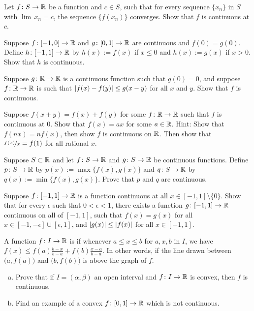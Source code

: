\begin{exercise} \label{exercise:contseqalt}
Let $f \colon S \to {\mathbb{R}}$ be a function and $c \in S$, such that for every
sequence $\{ x_n \}$ in $S$ with $\lim\, x_n = c$, the sequence
$\{ f(x_n) \}$ converges.  Show that $f$ is continuous at $c$.
\end{exercise}

\begin{exercise}
Suppose $f \colon [-1,0] \to {\mathbb{R}}$ and $g \colon [0,1] \to {\mathbb{R}}$ are continuous
and $f(0) = g(0)$.  Define $h \colon [-1,1] \to {\mathbb{R}}$ by 
$h(x) := f(x)$ if $x \leq 0$ and $h(x) := g(x)$ if $x > 0$.  Show that
$h$ is continuous.
\end{exercise}

\begin{exercise}
Suppose $g \colon {\mathbb{R}} \to {\mathbb{R}}$ is a continuous function such that $g(0) = 0$,
and suppose $f \colon {\mathbb{R}} \to {\mathbb{R}}$ is such that
$\left\lvert {f(x)-f(y)} \right\rvert \leq g(x-y)$ for all $x$ and $y$.  Show that $f$ is
continuous.
\end{exercise}

\begin{exercise}[Challenging]
Suppose $f(x+y) = f(x) + f(y)$ for some $f \colon {\mathbb{R}} \to {\mathbb{R}}$
such that $f$ is continuous at 0.
Show that $f(x) = ax$ for some $a \in {\mathbb{R}}$.
Hint: Show that $f(nx) = nf(x)$, then show $f$ is continuous on ${\mathbb{R}}$.
Then show that $\nicefrac{f(x)}{x} = f(1)$ for all rational $x$.
\end{exercise}

\begin{exercise} \label{exercise:minmaxcont}
Suppose $S \subset {\mathbb{R}}$ and
let $f \colon S \to {\mathbb{R}}$ and
$g \colon S \to {\mathbb{R}}$ be continuous functions.
Define $p \colon S \to {\mathbb{R}}$ by
$p(x) := \max \{ f(x) , g(x) \}$ and
$q \colon S \to {\mathbb{R}}$ by
$q(x) := \min \{ f(x) , g(x) \}$.  Prove that $p$ and $q$ are
continuous.
\end{exercise}

\begin{exercise}
Suppose $f \colon [-1,1] \to {\mathbb{R}}$ is a function continuous at all $x \in
[-1,1] \setminus \{ 0 \}$.  Show that for every $\epsilon$ such
that $0 < \epsilon < 1$, there exists
a function $g \colon [-1,1] \to {\mathbb{R}}$ continuous on all of $[-1,1]$, such that
$f(x) = g(x)$ for all $x \in [-1,-\epsilon] \cup [\epsilon,1]$, and 
$\left\lvert {g(x)} \right\rvert \leq \left\lvert {f(x)} \right\rvert$ for all $x \in [-1,1]$.
\end{exercise}

\begin{exercise}[Challenging]
A function $f \colon I \to {\mathbb{R}}$ is \emph{} if
whenever $a \leq x \leq b$ for $a,x,b$ in $I$, we have
$f(x) \leq f(a) \frac{b-x}{b-a} + f(b) \frac{x-a}{b-a}$.  In other words,
if the line drawn between $\bigl(a,f(a)\bigr)$ and $\bigl(b,f(b)\bigr)$ 
is above the graph of $f$.
\begin{enumerate}[a)]
\item
Prove that
if $I = (\alpha,\beta)$ an open interval and $f \colon I \to {\mathbb{R}}$ is convex,
then $f$ is continuous.
\item
Find an example of a convex $f \colon [0,1] \to {\mathbb{R}}$ which is
not continuous.
\end{enumerate}
\end{exercise}


